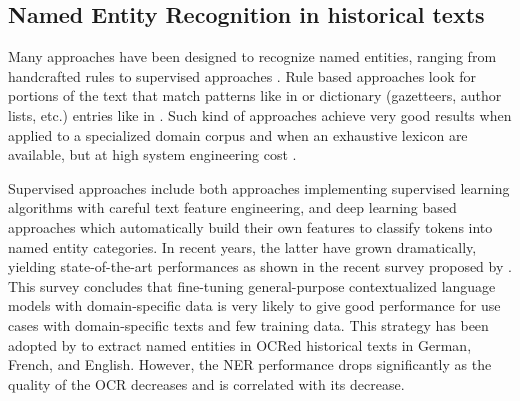 




\subsection{Named Entity Recognition in historical texts}
\label{subsection:stoa-ner-on-historical-texts}

Many approaches have been designed to recognize named entities, ranging from handcrafted rules to supervised approaches \cite{nadeau2007}.
Rule based approaches look for portions of the text that match patterns like in \cite{bell2020automated,nouvel2011} or dictionary (gazetteers, author lists, etc.) entries like in \cite{mansouri2008,maurel2011}.
Such kind of approaches achieve very good results when applied to a specialized domain corpus and when an exhaustive lexicon are available, but at high system engineering cost \cite{nadeau2007}. 

Supervised approaches include both approaches implementing supervised learning algorithms with careful text feature engineering, and deep learning based approaches which automatically build their own features to classify tokens into named entity categories.
In recent years, the latter have grown dramatically, yielding state-of-the-art performances as shown in the recent survey proposed by \cite{li2020}. This survey concludes that fine-tuning general-purpose contextualized language models with domain-specific data is very likely to give good performance for use cases with domain-specific texts and few training data. This strategy has been adopted by \cite{Labusch2020NamedED} to extract named entities in OCRed historical texts in German, French, and English. However, the NER performance drops significantly as the quality of the OCR decreases and is correlated with its decrease.

